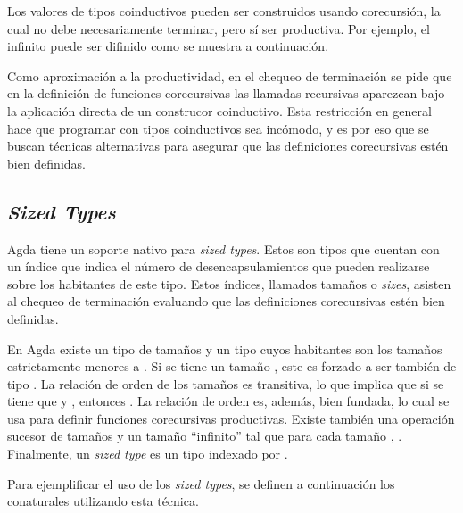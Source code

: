Los valores de tipos coinductivos pueden ser construidos usando corecursión, la cual no debe necesariamente terminar, pero sí ser productiva. Por ejemplo, el infinito puede ser difinido como se muestra a continuación.


Como aproximación a la productividad, en el chequeo de terminación se pide que en la definición de funciones corecursivas las llamadas recursivas aparezcan bajo la aplicación directa de un construcor coinductivo. Esta restricción en general hace que programar con tipos coinductivos sea incómodo, y es por eso que se buscan técnicas alternativas para asegurar que las definiciones corecursivas estén bien definidas. 

\subsection{\textit{Sized Types}}

Agda tiene un soporte nativo para \textit{sized types}. Estos son tipos que cuentan con un índice que indica el número de desencapsulamientos que pueden realizarse sobre los habitantes de este tipo. Estos índices, llamados tamaños o \textit{sizes}, asisten al chequeo de terminación evaluando que las definiciones corecursivas estén bien definidas. 

En Agda existe un tipo  de tamaños y un tipo   cuyos habitantes son los tamaños estrictamente menores a . Si se tiene un tamaño  \AgdaSymbol{:}  , este es forzado a ser también de tipo . La relación de orden de los tamaños es transitiva, lo que implica que si se tiene que  \AgdaSymbol{:}   y  \AgdaSymbol{:}  , entonces  \AgdaSymbol{:}  . La relación de orden es, además, bien fundada, lo cual se usa para definir funciones corecursivas productivas. Existe también una operación sucesor de tamaños \AgdaFunction{$\uparrow$} y un tamaño ``infinito'' \AgdaArgument{$\infty$} tal que para cada tamaño ,  \AgdaSymbol{:}  \AgdaArgument{$\infty$}. Finalmente, un \textit{sized type} es un tipo indexado por .

Para ejemplificar el uso de los \textit{sized types}, se definen a continuación los conaturales utilizando esta técnica.


